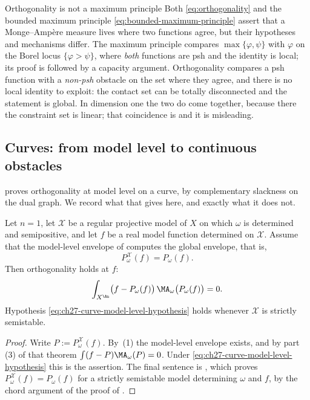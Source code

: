 \begin{warning}{Orthogonality is not a maximum principle}
Both \eqref{eq:orthogonality} and the bounded maximum principle
\eqref{eq:bounded-maximum-principle} assert that a Monge--Amp\`ere measure
lives where two functions agree, but their hypotheses and mechanisms
differ.  The maximum principle compares
$\max\{\varphi,\psi\}$ with $\varphi$ on the Borel locus
$\{\varphi>\psi\}$, where \emph{both} functions are psh and the identity
is local; its proof is  followed by a
capacity argument.  Orthogonality compares a psh function with a
\emph{non-psh} obstacle on the set where they agree, and there is no local
identity to exploit: the contact set can be totally disconnected and the
statement is global.  In dimension one the two do come together, because
there the constraint set is linear; that coincidence is
 and it is misleading.
\end{warning}

\subsection{Curves: from model level to continuous obstacles}
\label{sec:ch27-curve-orthogonality}

 proves orthogonality at model level on a curve, by
complementary slackness on the dual graph.  We record what that gives here,
and exactly what it does not.

\begin{proposition}
\label{prop:ch27-curve-orthogonality}
Let $n=1$, let $\mathcal X$ be a regular projective model of $X$ on
which $\omega$ is determined and semipositive, and let $f$ be a real
model function determined on $\mathcal X$.  Assume that the model-level
envelope of  computes the global
envelope, that is,
\begin{equation}\label{eq:ch27-curve-model-level-hypothesis}
 P^{\mathcal X}_\omega(f)=P_\omega(f).
\end{equation}
Then orthogonality holds at $f$:
\[
 \int_{X^{\An}}\bigl(f-P_\omega(f)\bigr)\,
   \MA_\omega\bigl(P_\omega(f)\bigr)=0 .
\]
Hypothesis \eqref{eq:ch27-curve-model-level-hypothesis} holds whenever
$\mathcal X$ is strictly semistable.
\end{proposition}

\begin{proof}
Write $P:=P^{\mathcal X}_\omega(f)$.  By
\,(1) the model-level envelope
exists, and by part (3) of that theorem
$\int(f-P)\MA_\omega(P)=0$.  Under
\eqref{eq:ch27-curve-model-level-hypothesis} this is the assertion.  The
final sentence is , which proves
$P^{\mathcal X}_\omega(f)=P_\omega(f)$ for a strictly semistable model
determining $\omega$ and $f$, by the chord argument of the proof of
.
\end{proof}

